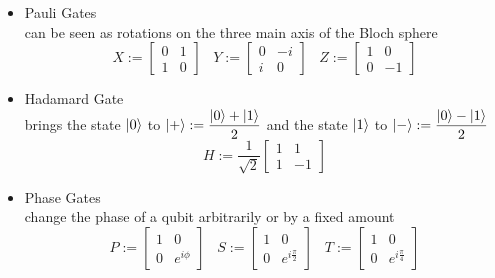 \documentclass{article}
\begin{document}
\begin{itemize}

	\item Pauli Gates\\
	      can be seen as rotations on the three main axis of the Bloch
	      sphere
	      \begin{equation}
		      X:=\begin{bmatrix}
			      0 & 1 \\
			      1 & 0
		      \end{bmatrix}
		      \hspace{10pt}
		      Y:=\begin{bmatrix}
			      0 & -i \\
			      i & 0
		      \end{bmatrix}
		      \hspace{10pt}
		      Z:=\begin{bmatrix}
			      1 & 0  \\
			      0 & -1
		      \end{bmatrix}
	      \end{equation}


	\item Hadamard Gate\\
	      brings the state $\ket{0}$ to
	      $\ket{+} := \dfrac{\ket{0}+\ket{1}}{2}$
	      and the state $\ket{1}$ to $\ket{-} := \dfrac{\ket{0}-\ket{1}}{2}$
	      \begin{equation}
		      H:=\dfrac{1}{\sqrt{2}}\begin{bmatrix}
			      1 & 1  \\
			      1 & -1
		      \end{bmatrix}
	      \end{equation}

	\item Phase Gates \\
	      change the phase of a qubit arbitrarily or by a fixed amount
	      \begin{equation}
		      P:=\begin{bmatrix}
			      1 & 0         \\
			      0 & e^{i\phi}
		      \end{bmatrix}
		      \hspace{10pt}
		      S:=\begin{bmatrix}
			      1 & 0                   \\
			      0 & e^{i\tfrac{\pi}{2}}
		      \end{bmatrix}
		      \hspace{10pt}
		      T:=\begin{bmatrix}
			      1 & 0                   \\
			      0 & e^{i\tfrac{\pi}{4}}
		      \end{bmatrix}
	      \end{equation}
\end{itemize}
\end{document}
